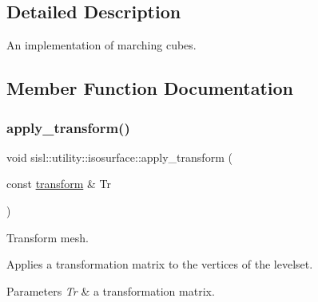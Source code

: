 \subsection{Detailed Description}
An implementation of marching cubes. 

\subsection{Member Function Documentation}
\mbox{\label{classsisl_1_1utility_1_1isosurface_a73bd6c29b9a5a1ff6f34120d2dac5d65}} 
\subsubsection{\texorpdfstring{apply\+\_\+transform()}{apply\_transform()}}
{\footnotesize\ttfamily void sisl\+::utility\+::isosurface\+::apply\+\_\+transform (\begin{DoxyParamCaption}\item[{const \hyperlink{namespacesisl_a2ef12d285ca3e626c05abbdec1f8a679}{transform} \&}]{Tr }\end{DoxyParamCaption})\hspace{0.3cm}{\ttfamily [inline]}}



Transform mesh. 

Applies a transformation matrix to the vertices of the levelset. 
\begin{DoxyParams}{Parameters}
{\em Tr} & a transformation matrix. \\
\hline
\end{DoxyParams}
\mbox{\label{classsisl_1_1utility_1_1isosurface_ad81b29590b262cf30286591090eabb13}} 
